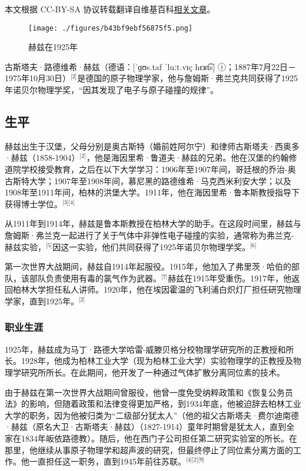 
本文根据 CC-BY-SA 协议转载翻译自维基百科\href{https://en.wikipedia.org/wiki/Gustav_Ludwig_Hertz}{相关文章}。

\begin{figure}[ht]
\centering
\texttt{[image: ./figures/b43bf9ebf56875f5.png]}
\caption{赫兹在1925年} \label{fig_GSTFhz_1}
\end{figure}
古斯塔夫·路德维希·赫兹（德语：[ˈɡʊs.taf ˈluːt.vɪç hɛʁt͡s] ⓘ；1887年7月22日－1975年10月30日）\(^\text{[2]}\)是德国的原子物理学家，他与詹姆斯·弗兰克共同获得了1925年诺贝尔物理学奖，“因其发现了电子与原子碰撞的规律”。
\subsection{生平}
赫兹出生于汉堡，父母分别是奥古斯特（婚前姓阿尔宁）和律师古斯塔夫·西奥多·赫兹（1858-1904）\(^\text{[2]}\)，他是海因里希·鲁道夫·赫兹的兄弟。他在汉堡的约翰修道院学校接受教育，之后在以下大学学习：1906年至1907年间，哥廷根的乔治-奥古斯特大学；1907年至1908年间，慕尼黑的路德维希·马克西米利安大学；以及1908年至1911年间，柏林的洪堡大学。1911年，他在海因里希·鲁本斯教授指导下获得博士学位。\(^\text{[3][4]}\)

从1911年到1914年，赫兹是鲁本斯教授在柏林大学的助手。在这段时间里，赫兹与詹姆斯·弗兰克一起进行了关于气体中非弹性电子碰撞的实验，通常称为弗兰克-赫兹实验，\(^\text{[5]}\)因这一实验，他们共同获得了1925年诺贝尔物理学奖。\(^\text{[6]}\)

第一次世界大战期间，赫兹自1914年起服役。1915年，他加入了弗里茨·哈伯的部队，该部队负责使用有毒的氯气作为武器。\(^\text{[7]}\)赫兹在1915年受重伤。1917年，他返回柏林大学担任私人讲师。1920年，他在埃因霍温的飞利浦白炽灯厂担任研究物理学家，直到1925年。\(^\text{[2]}\)
\subsubsection{职业生涯}
1925年，赫兹成为马丁·路德大学哈雷-威滕贝格分校物理学研究所的正教授和所长。1928年，他成为柏林工业大学（现为柏林工业大学）实验物理学的正教授及物理学研究所所长。在此期间，他开发了一种通过气体扩散分离同位素的技术。

由于赫兹在第一次世界大战期间曾服役，他曾一度免受纳粹政策和《恢复公务员法》的影响，但随着政策和法律变得更加严格，到1934年底，他被迫辞去柏林工业大学的职务，因为他被归类为“二级部分犹太人”（他的祖父古斯塔夫·费尔迪南德·赫兹（原名大卫·古斯塔夫·赫兹）（1827-1914）童年时期曾是犹太人，直到全家在1834年皈依路德教）。随后，他在西门子公司担任第二研究实验室的所长。在那里，他继续从事原子物理学和超声波的研究，但最终停止了同位素分离方面的工作。他一直担任这一职务，直到1945年前往苏联。\(^\text{[4][2][9]}\)
